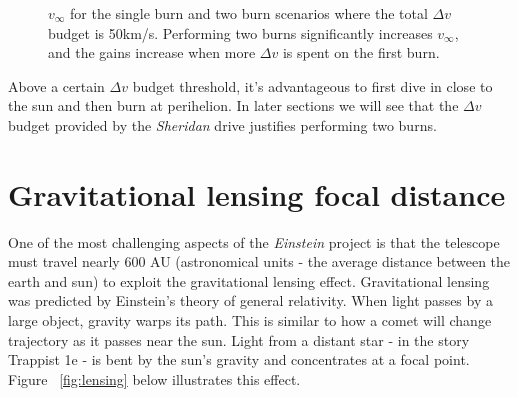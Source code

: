 \documentclass[12pt]{article} %
\begin{document}
\begin{figure}[H]
\caption{$v_{\infty}$ for the single burn and two burn scenarios where the total $\Delta v$ budget is 50km/s. Performing two burns significantly increases $v_{\infty}$, and the gains increase when more $\Delta v$ is spent on the first burn.}
\label{fig:highdv}
\end{figure}

Above a certain $\Delta v$ budget threshold, it's advantageous to first dive in close to the sun and then burn at perihelion. In later sections we will see that the $\Delta v$ budget provided by the \textit{Sheridan} drive justifies performing two burns.

\section{Gravitational lensing focal distance}
\label{sec:lensing}
One of the most challenging aspects of the \textit{Einstein} project is that the telescope must travel nearly 600 AU (astronomical units - the average distance between the earth and sun) to exploit the gravitational lensing effect. Gravitational lensing was predicted by Einstein's theory of general relativity. When light passes by a large object, gravity warps its path. This is similar to how a comet will change trajectory as it passes near the sun. Light from a distant star - in the story Trappist 1e - is bent by the sun's gravity and concentrates at a focal point. Figure ~\ref{fig:lensing} below illustrates this effect.
\end{document}

